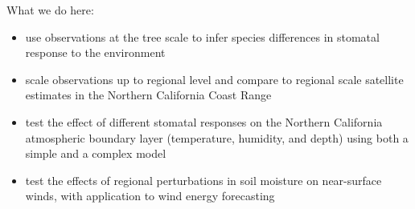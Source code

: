 What we do here:
\begin{itemize}
\item use observations at the tree scale to infer species differences in stomatal response to the environment
\item scale observations up to regional level and compare to regional scale satellite estimates in the Northern California Coast Range
\item test the effect of different stomatal responses on the Northern California atmospheric boundary layer (temperature, humidity, and depth) using both a simple and a complex model
\item test the effects of regional perturbations in soil moisture on near-surface winds, with application to wind energy forecasting
\end{itemize}